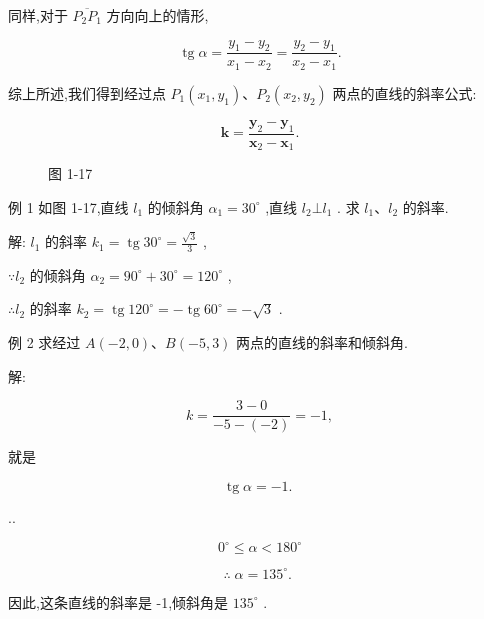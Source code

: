 \documentclass[lang=cn,newtx,12pt,scheme=chinese]{elegantbook}
\begin{document}
同样,对于 \(\overline{{P}_{2}{P}_{1}}\) 方向向上的情形,

\[
  \operatorname{tg}\alpha = \frac{{y}_{1} - {y}_{2}}{{x}_{1} - {x}_{2}} = \frac{{y}_{2} - {y}_{1}}{{x}_{2} - {x}_{1}}.
\]

\begin{corollary}[直线上两点的斜率公式]
综上所述,我们得到经过点 \({P}_{1}\left( {{x}_{1},{y}_{1}}\right) \text{、}{P}_{2}\left( {{x}_{2},{y}_{2}}\right)\) 两点的直线的斜率公式:

\[
  \mathbf{k} = \frac{{\mathbf{y}}_{2} - {\mathbf{y}}_{1}}{{\mathbf{x}}_{2} - {\mathbf{x}}_{1}}.
\]
\end{corollary}

\begin{figure}[h]
  \centering
  
  \caption{图 1-17}
\end{figure}



例 1 如图 1-17,直线 \({l}_{1}\) 的倾斜角 \({\alpha }_{1} = {30}^{ \circ }\) ,直线 \({l}_{2} \bot {l}_{1}\) . 求 \({l}_{1}\text{、}{l}_{2}\) 的斜率.

解: \({l}_{1}\) 的斜率 \({k}_{1} = \operatorname{tg}{30}^{ \circ } = \frac{\sqrt{3}}{3}\) ,

\(\because {l}_{2}\) 的倾斜角 \({\alpha }_{2} = {90}^{ \circ } + {30}^{ \circ } = {120}^{ \circ }\) ,

\(\therefore {l}_{2}\) 的斜率 \({k}_{2} = \operatorname{tg}{120}^{ \circ } = - \operatorname{tg}{60}^{ \circ } = - \sqrt{3}\) .

例 2 求经过 \(A\left( {-2,0}\right) \text{、}B\left( {-5,3}\right)\) 两点的直线的斜率和倾斜角.

解:

\[
  k = \frac{3 - 0}{-5 - \left( {-2}\right) } = - 1,
\]

就是

\[
  \operatorname{tg}\alpha = - 1\text{. }
\]

..

\[
    {0}^{ \circ } \leq \alpha < {180}^{ \circ }
\]

\[
  \therefore \;\alpha = {135}^{ \circ }\text{. }
\]

因此,这条直线的斜率是 -1,倾斜角是 \({135}^{ \circ }\) .
\end{document}
